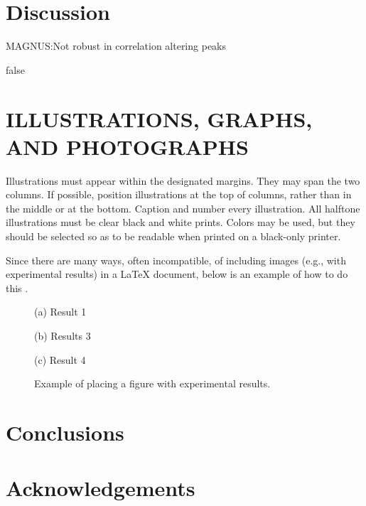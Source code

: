 \documentclass{article}
\begin{document}
\section{Discussion}
MAGNUS:Not robust in correlation altering peaks

\if false
\section{ILLUSTRATIONS, GRAPHS, AND PHOTOGRAPHS}
\label{sec:illust}

Illustrations must appear within the designated margins.  They may span the two
columns.  If possible, position illustrations at the top of columns, rather
than in the middle or at the bottom.  Caption and number every illustration.
All halftone illustrations must be clear black and white prints.  Colors may be
used, but they should be selected so as to be readable when printed on a
black-only printer.

Since there are many ways, often incompatible, of including images (e.g., with
experimental results) in a LaTeX document, below is an example of how to do
this \cite{Lamp86}.

\begin{figure}[htb]

\begin{minipage}[b]{1.0\linewidth}
  \centering
  \centerline{(a) Result 1}\medskip
\end{minipage}
%
\begin{minipage}[b]{.48\linewidth}
  \centering
  \centerline{(b) Results 3}\medskip
\end{minipage}
\hfill
\begin{minipage}[b]{0.48\linewidth}
  \centering
  \centerline{(c) Result 4}\medskip
\end{minipage}
%
\caption{Example of placing a figure with experimental results.}
\label{fig:res}
%
\end{figure}

\vfill
\pagebreak
\fi
\section{Conclusions}
\section{Acknowledgements}


\end{document}
